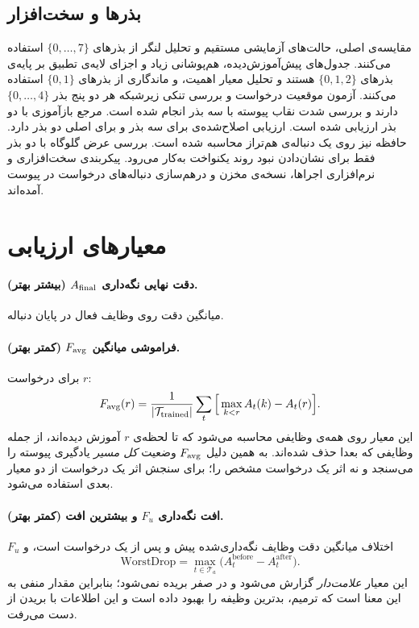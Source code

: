 \subsection{بذرها و سخت‌افزار}
\label{subsec:res-seeds}

مقایسه‌ی اصلی، حالت‌های آزمایشی مستقیم  و تحلیل لنگر از بذرهای $\{0,\ldots,7\}$ استفاده می‌کنند. جدول‌های پیش‌آموزش‌دیده، هم‌پوشانی زیاد و اجزای لایه‌ی تطبیق بر پایه‌ی بذرهای $\{0,1,2\}$ هستند و تحلیل معیار اهمیت،  و ماندگاری از بذرهای $\{0,1\}$ استفاده می‌کنند. آزمون موقعیت درخواست و بررسی تنکی زیرشبکه هر دو پنج بذر $\{0,\ldots,4\}$ دارند و بررسی شدت نقاب پیوسته با سه بذر انجام شده است. مرجع بازآموزی با دو بذر ارزیابی شده است. ارزیابی اصلاح‌شده‌ی  برای  سه بذر و برای  اصلی دو بذر دارد. حافظه نیز روی یک دنباله‌ی هم‌تراز محاسبه شده است. بررسی عرض گلوگاه با دو بذر فقط برای نشان‌دادن نبود روند یکنواخت به‌کار می‌رود. پیکربندی سخت‌افزاری و نرم‌افزاری اجراها، نسخه‌ی مخزن و درهم‌سازی دنباله‌های درخواست در پیوست آمده‌اند.

\section{معیارهای ارزیابی}
\label{sec:res-metrics}

\paragraph{دقت نهایی نگه‌داری $A_{\mathrm{final}}$ (بیشتر بهتر).} میانگین دقت روی وظایف فعال در پایان دنباله.

\paragraph{فراموشی میانگین $F_{\mathrm{avg}}$ (کمتر بهتر).} برای درخواست $r$:
\begin{equation}
	\label{eq:favg}
	F_{\mathrm{avg}}(r)=\frac{1}{|\mathcal{T}_{\mathrm{trained}}|}\sum_{t}\Big[\max_{k<r}A_t(k)-A_t(r)\Big].
\end{equation}
این معیار روی همه‌ی وظایفی محاسبه می‌شود که تا لحظه‌ی $r$ آموزش دیده‌اند، از جمله وظایفی که بعدا حذف شده‌اند. به همین دلیل $F_{\mathrm{avg}}$ وضعیت \emph{کل مسیر} یادگیری پیوسته را می‌سنجد و نه اثر یک درخواست مشخص را؛ برای سنجش اثر یک درخواست از دو معیار بعدی استفاده می‌شود.

\paragraph{افت نگه‌داری $F_u$ و بیشترین افت (کمتر بهتر).} $F_u$ اختلاف میانگین دقت وظایف نگه‌داری‌شده پیش و پس از یک درخواست است، و
\begin{equation}
	\label{eq:worstdrop}
	\mathrm{WorstDrop} = \max_{t \in \mathcal{T}_{a}} \big( A_{t}^{\mathrm{before}} - A_{t}^{\mathrm{after}} \big).
\end{equation}
این معیار \emph{علامت‌دار} گزارش می‌شود و در صفر بریده نمی‌شود؛ بنابراین مقدار منفی به این معنا است که ترمیم، بدترین وظیفه را بهبود داده است و این اطلاعات با بریدن از دست می‌رفت.

